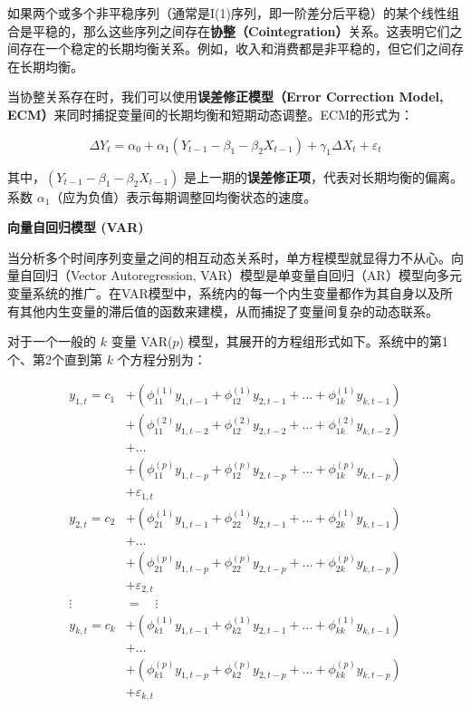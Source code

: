 如果两个或多个非平稳序列（通常是I(1)序列，即一阶差分后平稳）的某个线性组合是平稳的，那么这些序列之间存在\textbf{协整（Cointegration）}关系。这表明它们之间存在一个稳定的长期均衡关系。例如，收入和消费都是非平稳的，但它们之间存在长期均衡。

当协整关系存在时，我们可以使用\textbf{误差修正模型（Error Correction Model, ECM）}来同时捕捉变量间的长期均衡和短期动态调整。ECM的形式为：

\begin{equation}
\Delta Y_t = \alpha_0 + \alpha_1 (Y_{t-1} - \beta_1 - \beta_2 X_{t-1}) + \gamma_1 \Delta X_t + \varepsilon_t
\end{equation}

其中，$(Y_{t-1} - \beta_1 - \beta_2 X_{t-1})$ 是上一期的\textbf{误差修正项}，代表对长期均衡的偏离。系数 $\alpha_1$（应为负值）表示每期调整回均衡状态的速度。

\textbf{向量自回归模型 (VAR)}

当分析多个时间序列变量之间的相互动态关系时，单方程模型就显得力不从心。向量自回归（Vector Autoregression, VAR）模型是单变量自回归（AR）模型向多元变量系统的推广。在VAR模型中，系统内的每一个内生变量都作为其自身以及所有其他内生变量的滞后值的函数来建模，从而捕捉了变量间复杂的动态联系。

对于一个一般的 $k$ 变量 VAR($p$) 模型，其展开的方程组形式如下。系统中的第1个、第2个直到第 $k$ 个方程分别为：

\begin{equation}
\begin{aligned}
y_{1,t} = c_1 &+ \left( \phi_{11}^{(1)} y_{1,t-1} + \phi_{12}^{(1)} y_{2,t-1} + \dots + \phi_{1k}^{(1)} y_{k,t-1} \right) \\
              &+ \left( \phi_{11}^{(2)} y_{1,t-2} + \phi_{12}^{(2)} y_{2,t-2} + \dots + \phi_{1k}^{(2)} y_{k,t-2} \right) \\
              &+ \dots \\
              &+ \left( \phi_{11}^{(p)} y_{1,t-p} + \phi_{12}^{(p)} y_{2,t-p} + \dots + \phi_{1k}^{(p)} y_{k,t-p} \right) \\
              &+ \varepsilon_{1,t} \\
y_{2,t} = c_2 &+ \left( \phi_{21}^{(1)} y_{1,t-1} + \phi_{22}^{(1)} y_{2,t-1} + \dots + \phi_{2k}^{(1)} y_{k,t-1} \right) \\
              &+ \dots \\
              &+ \left( \phi_{21}^{(p)} y_{1,t-p} + \phi_{22}^{(p)} y_{2,t-p} + \dots + \phi_{2k}^{(p)} y_{k,t-p} \right) \\
              &+ \varepsilon_{2,t} \\
\vdots \quad &= \quad \vdots \\
y_{k,t} = c_k &+ \left( \phi_{k1}^{(1)} y_{1,t-1} + \phi_{k2}^{(1)} y_{2,t-1} + \dots + \phi_{kk}^{(1)} y_{k,t-1} \right) \\
              &+ \dots \\
              &+ \left( \phi_{k1}^{(p)} y_{1,t-p} + \phi_{k2}^{(p)} y_{2,t-p} + \dots + \phi_{kk}^{(p)} y_{k,t-p} \right) \\
              &+ \varepsilon_{k,t}
\end{aligned}
\end{equation}

